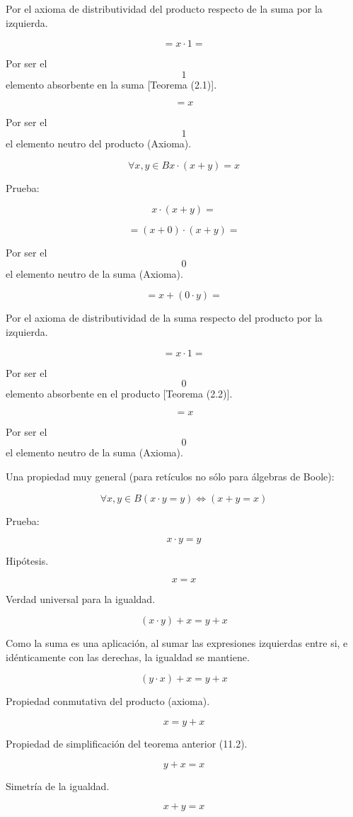 Por el axioma de distributividad del producto respecto de la suma por la
izquierda.

\[{= {x \cdot 1}} =\]

Por ser el \[1\] elemento absorbente en la suma {[}Teorema (2.1){]}.

\[= x\]

Por ser el \[1\]el elemento neutro del producto (Axioma).

\[\forall x,{y \in B}{{x \cdot {({x + y})}} = x}\]

Prueba:

\[{x \cdot {({x + y})}} = {}\]

\[{= {{({x + 0})} \cdot {({x + y})}}} =\]

Por ser el \[0\] el elemento neutro de la suma (Axioma).

\[{= {x + {({0 \cdot y})}}} =\]

Por el axioma de distributividad de la suma respecto del producto por la
izquierda.

\[{= {x \cdot 1}} =\]

Por ser el \[0\] elemento absorbente en el producto {[}Teorema (2.2){]}.

\[= x\]

Por ser el \[0\]el elemento neutro de la suma (Axioma).

Una propiedad muy general (para retículos no sólo para álgebras de
Boole):

\[\forall x,{y \in B}{}{}{}{({{x \cdot y} = y})}\Leftrightarrow{({{x + y} = x})}\]

Prueba:

\[{x \cdot y} = y\]

Hipótesis.

\[x = x\]

Verdad universal para la igualdad.

\[{{({x \cdot y})} + x} = {y + x}\]

Como la suma es una aplicación, al sumar las expresiones izquierdas
entre si, e idénticamente con las derechas, la igualdad se mantiene.

\[{{({y \cdot x})} + x} = {y + x}\]

Propiedad conmutativa del producto (axioma).

\[x = {y + x}\]

Propiedad de simplificación del teorema anterior (11.2).

\[{y + x} = x\]

Simetría de la igualdad.

\[{x + y} = x\]

